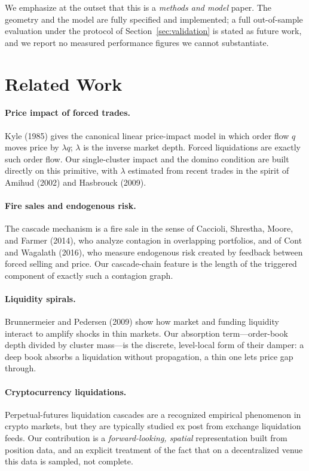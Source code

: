 \documentclass[11pt,a4paper]{article}
\theoremstyle{definition}
\theoremstyle{plain}
\begin{document}
We emphasize at the outset that this is a \emph{methods and model} paper. The geometry and the model
are fully specified and implemented; a full out-of-sample evaluation under the protocol of
Section~\ref{sec:validation} is stated as future work, and we report no measured performance figures
we cannot substantiate.

\section{Related Work}
\label{sec:related}

\paragraph{Price impact of forced trades.}
Kyle (1985) gives the canonical linear price-impact model in which order flow $q$ moves price by
$\lambda q$; $\lambda$ is the inverse market depth. Forced liquidations are exactly such order flow.
Our single-cluster impact and the domino condition are built directly on this primitive, with
$\lambda$ estimated from recent trades in the spirit of Amihud (2002) and Hasbrouck (2009).

\paragraph{Fire sales and endogenous risk.}
The cascade mechanism is a fire sale in the sense of Caccioli, Shrestha, Moore, and Farmer (2014),
who analyze contagion in overlapping portfolios, and of Cont and Wagalath (2016), who measure
endogenous risk created by feedback between forced selling and price. Our cascade-chain feature is
the length of the triggered component of exactly such a contagion graph.

\paragraph{Liquidity spirals.}
Brunnermeier and Pedersen (2009) show how market and funding liquidity interact to amplify shocks
in thin markets. Our absorption term---order-book depth divided by cluster mass---is the
discrete, level-local form of their damper: a deep book absorbs a liquidation without propagation,
a thin one lets price gap through.

\paragraph{Cryptocurrency liquidations.}
Perpetual-futures liquidation cascades are a recognized empirical phenomenon in crypto markets, but
they are typically studied ex post from exchange liquidation feeds. Our contribution is a
\emph{forward-looking, spatial} representation built from position data, and an explicit treatment
of the fact that on a decentralized venue this data is sampled, not complete.
\end{document}
